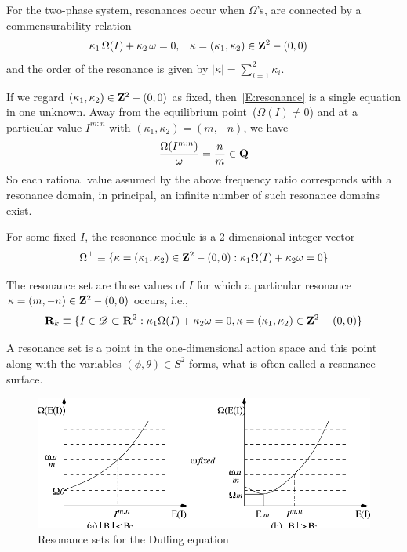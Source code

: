 \begin{definition}[Resonance]
For the two-phase system, resonances occur when $\Omega$'s, are connected by a commensurability relation
\begin{align}
\kappa_1 \,\Omega(I) + \kappa_2 \, \omega &= 0, & \kappa &= (\kappa_1,\kappa_2) \in \mathbf Z^2 - (0,0)
\label{E:resonance}
\end{align}
and the order of the resonance is given by $|\kappa| = \sum_{i=1}^2 \kappa_i$.
\end{definition}
If we regard $(\kappa_1,\kappa_2) \in \mathbf Z^2 -(0,0)$ as fixed, then~\eqref{E:resonance} is a single equation in one unknown. Away from the equilibrium point~($\Omega(I) \neq 0$) and at a particular value $I^{m:n}$ with $(\kappa_1,\kappa_2)=(m,-n)$, we have
\[
\frac{\Omega(I^{m:n})}{\omega} = \frac{n}{m} \in \mathbf Q
\]
So each rational value assumed by the above frequency ratio corresponds with a resonance domain, in principal, an infinite number of such resonance domains exist.
\begin{definition}
For some fixed $I$, the resonance module is a 2-dimensional integer vector
\[
\Omega^{\perp} \equiv \{ \kappa = (\kappa_1,\kappa_2) \in \mathbf Z^2 - (0,0): \kappa_1 \Omega(I) + \kappa_2 \omega = 0 \}
\]
\end{definition}
\begin{definition}
The resonance set are those values of $I$ for which a particular resonance $\kappa = (m,-n) \in \mathbf Z^2 - (0,0)$ occurs, i.e.,
\[
\mathbf R_k \equiv \{ I \in \mathscr D \subset \mathbf R^2: \kappa_1 \Omega(I) + \kappa_2 \omega  = 0, \kappa = (\kappa_1,\kappa_2) \in \mathbf Z^2 - (0,0) \}
\]
\end{definition}
A resonance set is a point in the one-dimensional action space and this point along with the variables $(\phi, \theta) \in S^2$ forms, what is often called a resonance surface.
\begin{figure}[htbp]
\centering
\includegraphics[width=\textwidth]{figures/freq}
\caption{Resonance sets for the Duffing equation}
\label{F:frequency}
\end{figure}
